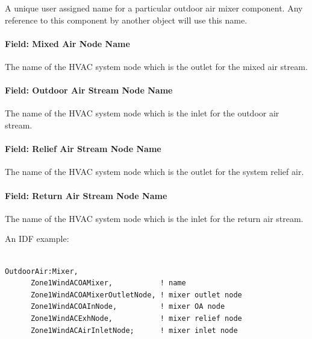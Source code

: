 A unique user assigned name for a particular outdoor air mixer component. Any reference to this component by another object will use this name.

\paragraph{Field: Mixed Air Node Name}\label{field-mixed-air-node-name}

The name of the HVAC system node which is the outlet for the mixed air stream.

\paragraph{Field: Outdoor Air Stream Node Name}\label{field-outdoor-air-stream-node-name}

The name of the HVAC system node which is the inlet for the outdoor air stream.

\paragraph{Field: Relief Air Stream Node Name}\label{field-relief-air-stream-node-name}

The name of the HVAC system node which is the outlet for the system relief air.

\paragraph{Field: Return Air Stream Node Name}\label{field-return-air-stream-node-name}

The name of the HVAC system node which is the inlet for the return air stream.

An IDF example:

\begin{lstlisting}

OutdoorAir:Mixer,
      Zone1WindACOAMixer,           ! name
      Zone1WindACOAMixerOutletNode, ! mixer outlet node
      Zone1WindACOAInNode,          ! mixer OA node
      Zone1WindACExhNode,           ! mixer relief node
      Zone1WindACAirInletNode;      ! mixer inlet node
\end{lstlisting}